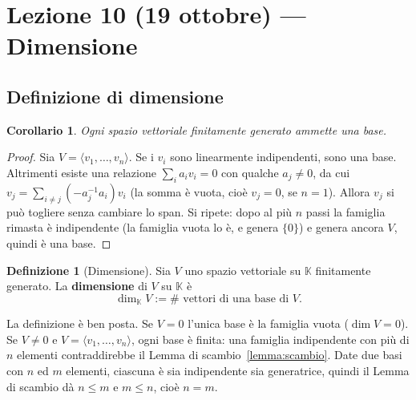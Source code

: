 \documentclass[11pt,a4paper]{article}
\newcommand{\KK}{\mathbb{K}}
\theoremstyle{plain}
\newtheorem{cor}[prop]{Corollario}
\theoremstyle{definition}
\newtheorem{defn}[prop]{Definizione}
\theoremstyle{remark}
\begin{document}
\section{Lezione 10 (19 ottobre) --- Dimensione}

\subsection{Definizione di dimensione}

\begin{cor}
Ogni spazio vettoriale finitamente generato ammette una base.
\end{cor}

\begin{proof}
Sia $V=\langle v_1,\dots,v_n\rangle$. Se i $v_i$ sono linearmente indipendenti, sono una base. Altrimenti esiste una relazione $\sum_ia_iv_i=0$ con qualche $a_j\ne0$, da cui $v_j=\sum_{i\ne j}(-a_j^{-1}a_i)v_i$ (la somma è vuota, cioè $v_j=0$, se $n=1$). Allora $v_j$ si può togliere senza cambiare lo span. Si ripete: dopo al più $n$ passi la famiglia rimasta è indipendente (la famiglia vuota lo è, e genera $\{0\}$) e genera ancora $V$, quindi è una base.
\end{proof}

\begin{defn}[Dimensione]
Sia $V$ uno spazio vettoriale su $\KK$ finitamente generato. La \textbf{dimensione} di $V$ su $\KK$ è
\[
  \dim_{\KK}V:=\#\text{ vettori di una base di }V .
\]
\end{defn}

La definizione è ben posta. Se $V=0$ l'unica base è la famiglia vuota ($\dim V=0$). Se $V\ne0$ e $V=\langle v_1,\dots,v_n\rangle$, ogni base è finita: una famiglia indipendente con più di $n$ elementi contraddirebbe il Lemma di scambio~\ref{lemma:scambio}. Date due basi con $n$ ed $m$ elementi, ciascuna è sia indipendente sia generatrice, quindi il Lemma di scambio dà $n\le m$ e $m\le n$, cioè $n=m$.
\end{document}

